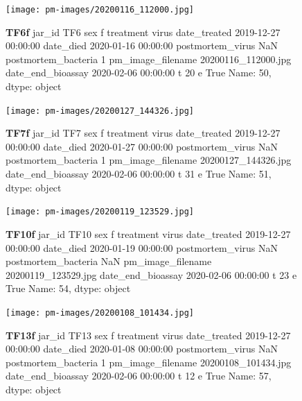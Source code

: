 \begin{figure}[h!]
\centering
\texttt{[image: pm-images/20200116\_112000.jpg]}
\caption{\textbf{TF6f} jar\_id                                 TF6
sex                                      f
treatment                            virus
date\_treated           2019-12-27 00:00:00
date\_died              2020-01-16 00:00:00
postmortem\_virus                       NaN
postmortem\_bacteria                      1
pm\_image\_filename      20200116\_112000.jpg
date\_end\_bioassay      2020-02-06 00:00:00
t                                       20
e                                     True
Name: 50, dtype: object}
\end{figure}
\clearpage

\begin{figure}[h!]
\centering
\texttt{[image: pm-images/20200127\_144326.jpg]}
\caption{\textbf{TF7f} jar\_id                                 TF7
sex                                      f
treatment                            virus
date\_treated           2019-12-27 00:00:00
date\_died              2020-01-27 00:00:00
postmortem\_virus                       NaN
postmortem\_bacteria                      1
pm\_image\_filename      20200127\_144326.jpg
date\_end\_bioassay      2020-02-06 00:00:00
t                                       31
e                                     True
Name: 51, dtype: object}
\end{figure}
\clearpage

\begin{figure}[h!]
\centering
\texttt{[image: pm-images/20200119\_123529.jpg]}
\caption{\textbf{TF10f} jar\_id                                TF10
sex                                      f
treatment                            virus
date\_treated           2019-12-27 00:00:00
date\_died              2020-01-19 00:00:00
postmortem\_virus                       NaN
postmortem\_bacteria                    NaN
pm\_image\_filename      20200119\_123529.jpg
date\_end\_bioassay      2020-02-06 00:00:00
t                                       23
e                                     True
Name: 54, dtype: object}
\end{figure}
\clearpage

\begin{figure}[h!]
\centering
\texttt{[image: pm-images/20200108\_101434.jpg]}
\caption{\textbf{TF13f} jar\_id                                TF13
sex                                      f
treatment                            virus
date\_treated           2019-12-27 00:00:00
date\_died              2020-01-08 00:00:00
postmortem\_virus                       NaN
postmortem\_bacteria                      1
pm\_image\_filename      20200108\_101434.jpg
date\_end\_bioassay      2020-02-06 00:00:00
t                                       12
e                                     True
Name: 57, dtype: object}
\end{figure}
\clearpage

